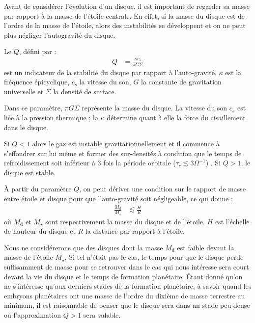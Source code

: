 Avant de considérer l'évolution d'un disque, il est important de regarder sa masse par rapport à la masse de l'étoile centrale. En effet, si la masse du disque est de l'ordre de la masse de l'étoile, alors des instabilités se développent et on ne peut plus négliger l'autogravité du disque. 

Le  $Q$, défini par \citep{toomre1964gravitational, goldreich1965gravitational}:
\begin{align}
Q &= \frac{\kappa c_{s}}{\pi G \Sigma}
\end{align}
est un indicateur de la stabilité du disque par rapport à l'auto-gravité. $\kappa$ est la fréquence épicyclique, $c_s$ la vitesse du son, $G$ la constante de gravitation universelle et $\Sigma$ la densité de surface. 

Dans ce paramètre, $\pi G \Sigma$ représente la masse du disque. La vitesse du son $c_{s}$ est liée à la pression thermique ; la  $\kappa$ détermine quant à elle la force du cisaillement dans le disque.

\bigskip

Si $Q<1$ alors le gaz est instable gravitationnellement et il commence à s'effondrer sur lui même et former des sur-densités à condition que le temps de refroidissement soit inférieur à 3 fois la période orbitale ($\tau_c \lesssim 3 \Omega^{-1}$) \citep{gammie2001nonlinear}.
Si $Q>1$, le disque est stable.

À partir du paramètre $Q$, on peut dériver une condition sur le rapport de masse entre étoile et disque pour que l'auto-gravité soit négligeable, ce qui donne \citep{gammie2001nonlinear} : 
\begin{align}
\frac{M_\text{d}}{M_\star} &\lesssim \frac{H}{R}
\end{align}
où $M_\text{d}$ et $M_\star$ sont respectivement la masse du disque et de l'étoile. $H$ est l'échelle de hauteur du disque et $R$ la distance par rapport à l'étoile.

Nous ne considérerons que des disques dont la masse $M_\text{d}$ est faible devant la masse de l'étoile $M_\star$. Si tel n'était pas le cas, le temps pour que le disque perde suffisamment de masse pour se retrouver dans le cas qui nous intéresse sera court devant la vie du disque et le temps de formation planétaire. Étant donné qu'on ne s'intéresse qu'aux derniers stades de la formation planétaire, à savoir quand les embryons planétaires ont une masse de l'ordre du dixième de masse terrestre au minimum, il est raisonnable de penser que le disque sera dans un stade peu dense où l'approximation $Q>1$ sera valable.

